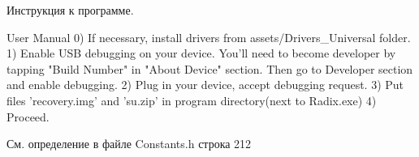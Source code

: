 Инструкция к программе. 
\begin{DoxyCode}
        User Manual
0) If necessary, install drivers from assets/Drivers\_Universal folder.
1) Enable USB debugging on your device.
   You\textcolor{stringliteral}{'ll need to become developer by tapping "Build Number" in "About Device" section.}
\textcolor{stringliteral}{   Then go to Developer section and enable debugging.}
\textcolor{stringliteral}{2) Plug in your device, accept debugging request.}
\textcolor{stringliteral}{3) Put files '}recovery.img\textcolor{stringliteral}{' and '}su.zip\textcolor{stringliteral}{' in program directory(next to Radix.exe) }
\textcolor{stringliteral}{4) Proceed.}
\end{DoxyCode}
 

См. определение в файле Constants.\+h строка 212

